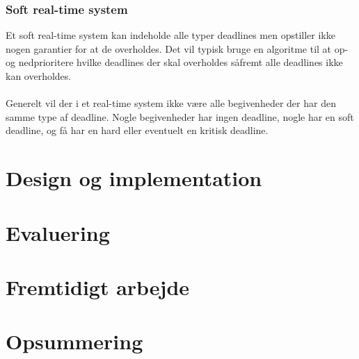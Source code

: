 \subsubsection{Soft real-time system}
Et soft real-time system kan indeholde alle typer deadlines men opstiller ikke nogen garantier for at de overholdes. Det vil typisk bruge en algoritme til at op- og nedprioritere hvilke deadlines der skal overholdes såfremt alle deadlines ikke kan overholdes.\\
\\

Generelt vil der i et real-time system ikke være alle begivenheder der har den samme type af deadline. Nogle begivenheder har ingen deadline, nogle har en soft deadline, og få har en hard eller eventuelt en kritisk deadline. 





\section{Design og implementation}
\section{Evaluering}
\section{Fremtidigt arbejde}
\section{Opsummering}
